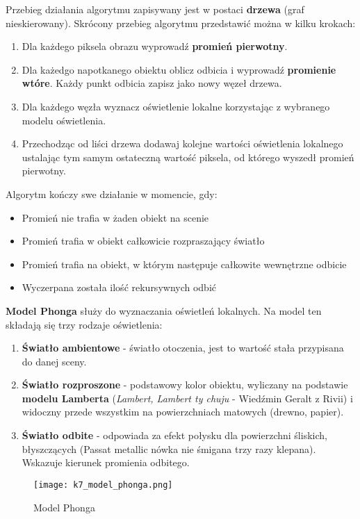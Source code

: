 Przebieg działania algorytmu zapisywany jest w postaci \textbf{drzewa} (graf nieskierowany). Skrócony przebieg algorytmu przedstawić można w kilku krokach:
\begin{enumerate}
	\item Dla każdego piksela obrazu wyprowadź \textbf{promień pierwotny}.
    \item Dla każedgo napotkanego obiektu oblicz odbicia i wyprowadź \textbf{promienie wtóre}. Każdy punkt odbicia zapisz jako nowy węzeł drzewa.
    \item Dla każdego węzła wyznacz oświetlenie lokalne korzystając z wybranego modelu oświetlenia.
    \item Przechodząc od liści drzewa dodawaj kolejne wartości oświetlenia lokalnego ustalając tym samym ostateczną wartość piksela, od którego wyszedł promień pierwotny.
\end{enumerate}

Algorytm kończy swe działanie w momencie, gdy:
\begin{itemize}
	\item Promień nie trafia w żaden obiekt na scenie
    \item Promień trafia w obiekt całkowicie rozpraszający światło
    \item Promień trafia na obiekt, w którym następuje całkowite wewnętrzne odbicie
    \item Wyczerpana została ilość rekursywnych odbić
\end{itemize}

\textbf{Model Phonga} służy do wyznaczania oświetleń lokalnych. Na model ten składają się trzy rodzaje oświetlenia:
\begin{enumerate}
	\item \textbf{Światło ambientowe} - światło otoczenia, jest to wartość stała przypisana do danej sceny.
	\item \textbf{Światło rozproszone} - podstawowy kolor obiektu, wyliczany na podstawie \textbf{modelu Lamberta} (\textit{Lambert, Lambert ty chuju} - Wiedźmin Geralt z Rivii) i widoczny przede wszystkim na powierzchniach matowych (drewno, papier).
	\item \textbf{Światło odbite} - odpowiada za efekt połysku dla powierzchni śliskich, błyszczących (Passat metallic nówka nie śmigana trzy razy klepana). Wskazuje kierunek promienia odbitego.
\end{enumerate}

\begin{figure}[!h]
\centering
\texttt{[image: k7\_model\_phonga.png]}
\caption{Model Phonga}
\end{figure}

